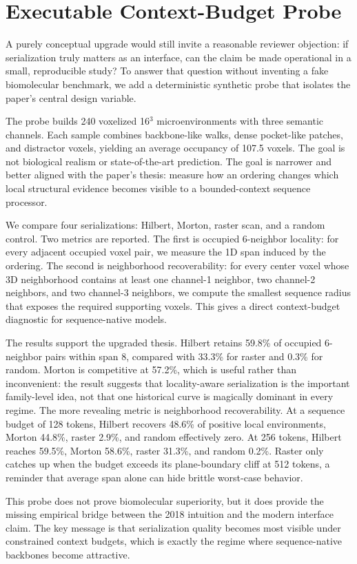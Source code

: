 \section{Executable Context-Budget Probe}




A purely conceptual upgrade would still invite a reasonable reviewer objection: if serialization truly matters as an interface, can the claim be made operational in a small, reproducible study? To answer that question without inventing a fake biomolecular benchmark, we add a deterministic synthetic probe that isolates the paper's central design variable.

The probe builds 240 voxelized 16$^3$ microenvironments with three semantic channels. Each sample combines backbone-like walks, dense pocket-like patches, and distractor voxels, yielding an average occupancy of 107.5 voxels. The goal is not biological realism or state-of-the-art prediction. The goal is narrower and better aligned with the paper's thesis: measure how an ordering changes which local structural evidence becomes visible to a bounded-context sequence processor.

We compare four serializations: Hilbert, Morton, raster scan, and a random control. Two metrics are reported. The first is occupied 6-neighbor locality: for every adjacent occupied voxel pair, we measure the 1D span induced by the ordering. The second is neighborhood recoverability: for every center voxel whose 3D neighborhood contains at least one channel-1 neighbor, two channel-2 neighbors, and two channel-3 neighbors, we compute the smallest sequence radius that exposes the required supporting voxels. This gives a direct context-budget diagnostic for sequence-native models.

The results support the upgraded thesis. Hilbert retains 59.8\% of occupied 6-neighbor pairs within span 8, compared with 33.3\% for raster and 0.3\% for random. Morton is competitive at 57.2\%, which is useful rather than inconvenient: the result suggests that locality-aware serialization is the important family-level idea, not that one historical curve is magically dominant in every regime. The more revealing metric is neighborhood recoverability. At a sequence budget of 128 tokens, Hilbert recovers 48.6\% of positive local environments, Morton 44.8\%, raster 2.9\%, and random effectively zero. At 256 tokens, Hilbert reaches 59.5\%, Morton 58.6\%, raster 31.3\%, and random 0.2\%. Raster only catches up when the budget exceeds its plane-boundary cliff at 512 tokens, a reminder that average span alone can hide brittle worst-case behavior.

This probe does not prove biomolecular superiority, but it does provide the missing empirical bridge between the 2018 intuition and the modern interface claim. The key message is that serialization quality becomes most visible under constrained context budgets, which is exactly the regime where sequence-native backbones become attractive.
